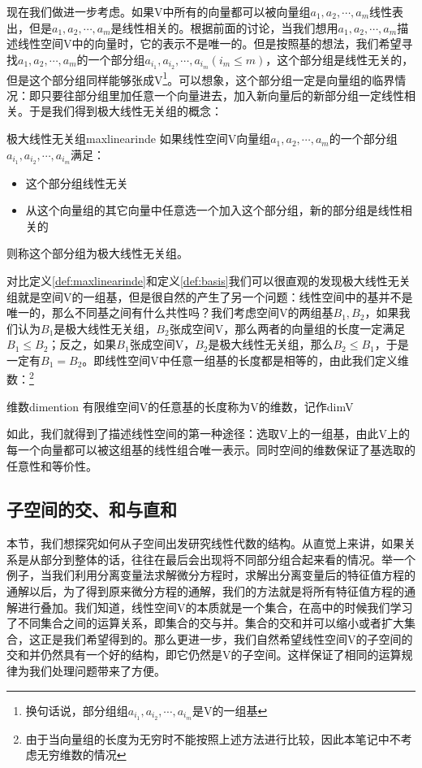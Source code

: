         现在我们做进一步考虑。如果V中所有的向量都可以被向量组$a_1,a_2,\cdots ,a_m$线性表出，但是$a_1,a_2,\cdots,a_m$是线性相关的。根据前面的讨论，当我们想用$a_1,a_2,\cdots,a_m$描述线性空间V中的向量时，它的表示不是唯一的。但是按照基的想法，我们希望寻找$a_1,a_2,\cdots,a_m$的一个部分组$a_{i_1},a_{i_2},\cdots,a_{i_m} (i_m\leq m)$，这个部分组是线性无关的，但是这个部分组同样能够张成V\footnote{换句话说，部分组组$a_{i_1},a_{i_2},\cdots,a_{i_m}$是V的一组基}。可以想象，这个部分组一定是向量组的临界情况：即只要往部分组里加任意一个向量进去，加入新向量后的新部分组一定线性相关。于是我们得到极大线性无关组的概念：
        \begin{definition}{极大线性无关组}{maxlinearinde}
            如果线性空间V向量组$a_1,a_2,\cdots,a_m$的一个部分组$a_{i_1},a_{i_2},\cdots,a_{i_m}$满足：
            \begin{itemize}
                \item 这个部分组线性无关
                \item 从这个向量组的其它向量中任意选一个加入这个部分组，新的部分组是线性相关的
            \end{itemize}
            
            则称这个部分组为极大线性无关组。
        \end{definition}
        对比定义\ref{def:maxlinearinde}和定义\ref{def:basis}我们可以很直观的发现极大线性无关组就是空间V的一组基，但是很自然的产生了另一个问题：线性空间中的基并不是唯一的，那么不同基之间有什么共性吗？我们考虑空间V的两组基$B_1,B_2$，如果我们认为$B_1$是极大线性无关组，$B_2$张成空间V，那么两者的向量组的长度一定满足$B_1\leq B_2$；反之，如果$B_1$张成空间V，$B_2$是极大线性无关组，那么$B_2\leq B_1$，于是一定有$B_1=B_2$。即线性空间V中任意一组基的长度都是相等的，由此我们定义维数：\footnote{由于当向量组的长度为无穷时不能按照上述方法进行比较，因此本笔记中不考虑无穷维数的情况}
        \begin{definition}{维数}{dimention}
            有限维空间V的任意基的长度称为V的维数，记作dimV
        \end{definition}
        
        如此，我们就得到了描述线性空间的第一种途径：选取V上的一组基，由此V上的每一个向量都可以被这组基的线性组合唯一表示。同时空间的维数保证了基选取的任意性和等价性。
    \subsection{子空间的交、和与直和}
    本节，我们想探究如何从子空间出发研究线性代数的结构。从直觉上来讲，如果关系是从部分到整体的话，往往在最后会出现将不同部分组合起来看的情况。举一个例子，当我们利用分离变量法求解微分方程时，求解出分离变量后的特征值方程的通解以后，为了得到原来微分方程的通解，我们的方法就是将所有特征值方程的通解进行叠加。我们知道，线性空间V的本质就是一个集合，在高中的时候我们学习了不同集合之间的运算关系，即集合的交与并。集合的交和并可以缩小或者扩大集合，这正是我们希望得到的。那么更进一步，我们自然希望线性空间V的子空间的交和并仍然具有一个好的结构，即它仍然是V的子空间。这样保证了相同的运算规律为我们处理问题带来了方便。
    
